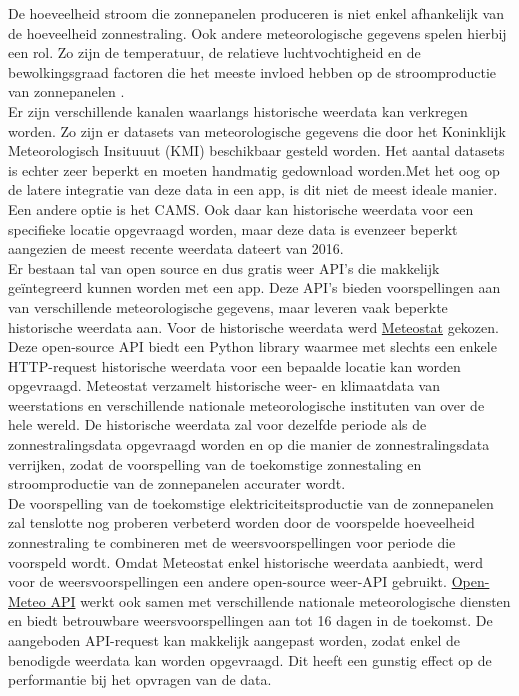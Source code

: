 De hoeveelheid stroom die zonnepanelen produceren is niet enkel afhankelijk van de hoeveelheid zonnestraling. Ook andere meteorologische gegevens spelen hierbij een rol. Zo zijn de temperatuur, de relatieve luchtvochtigheid en de bewolkingsgraad factoren die het meeste invloed hebben op de stroomproductie van zonnepanelen \autocite{Sehrawat2023}. \\

Er zijn verschillende kanalen waarlangs historische weerdata kan verkregen worden. Zo zijn er datasets van meteorologische gegevens die door het Koninklijk Meteorologisch Insituuut (KMI) beschikbaar gesteld worden. Het aantal datasets is echter zeer beperkt en moeten handmatig gedownload worden.Met het oog op de latere integratie van deze data in een app, is dit niet de meest ideale manier. Een andere optie is het CAMS. Ook daar kan historische weerdata voor een specifieke locatie opgevraagd worden, maar deze data is evenzeer beperkt aangezien de meest recente weerdata dateert van 2016. \\

Er bestaan tal van open source en dus gratis weer API's die makkelijk geïntegreerd kunnen worden met een app. Deze API's bieden voorspellingen aan van verschillende meteorologische gegevens, maar leveren vaak beperkte historische weerdata aan. Voor de historische weerdata werd \href{https://dev.meteostat.net/}{Meteostat} gekozen. Deze open-source API biedt een Python library waarmee met slechts een enkele HTTP-request historische weerdata voor een bepaalde locatie kan worden opgevraagd. Meteostat verzamelt historische weer- en klimaatdata van weerstations en verschillende nationale meteorologische instituten van over de hele wereld. De historische weerdata zal voor dezelfde periode als de zonnestralingsdata opgevraagd worden en op die manier de zonnestralingsdata verrijken, zodat de voorspelling van de toekomstige zonnestaling en stroomproductie van de zonnepanelen accurater wordt. \\

De voorspelling van de toekomstige elektriciteitsproductie van de zonnepanelen zal tenslotte nog proberen verbeterd worden door de voorspelde hoeveelheid zonnestraling te combineren met de weersvoorspellingen voor periode die voorspeld wordt. Omdat Meteostat enkel historische weerdata aanbiedt, werd voor de weersvoorspellingen een andere open-source weer-API gebruikt. \href{https://open-meteo.com/}{Open-Meteo API} werkt ook samen met verschillende nationale meteorologische diensten en biedt betrouwbare weersvoorspellingen aan tot 16 dagen in de toekomst. De aangeboden API-request kan makkelijk aangepast worden, zodat enkel de benodigde weerdata kan worden opgevraagd. Dit heeft een gunstig effect op de performantie bij het opvragen van de data.
